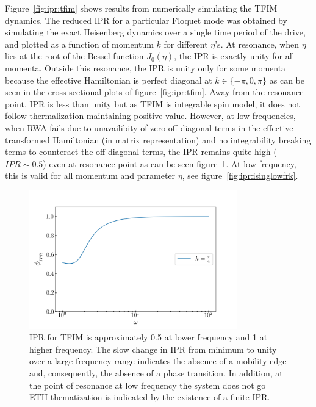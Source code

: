 \documentclass[%
reprint,
superscriptaddress,
amsmath,amssymb,
aps,
prb,
showkeys,
]{revtex4-2}
\begin{document}
	Figure~\ref{fig:ipr:tfim} shows results from numerically simulating the TFIM dynamics. The reduced IPR for a particular Floquet mode was obtained by simulating the exact Heisenberg dynamics over a single time period of the drive, and plotted as a function of momentum $k$ for different $\eta$'s. At resonance, when $\eta$ lies at the root of the Bessel function $J_0(\eta)$,  the IPR is exactly unity for all momenta. Outside this resonance, the IPR is unity only for some momenta because the effective Hamiltonian is perfect diagonal at $k \in{\{-\pi, 0, \pi\}}$ as can be seen in the cross-sectional plots of figure~\ref{fig:ipr:tfim}. Away from the resonance point, IPR is less than unity but as TFIM is integrable spin model, it does not follow thermalization maintaining positive value. However, at low frequencies, when RWA fails due to unavailibity of zero off-diagonal terms in the  effective transformed Hamiltonian (in matrix representation) and no integrability breaking terms to counteract the off diagonal terms, the IPR remains quite high ($IPR \sim 0.5$) even at resonance point as can be seen figure~\ref{fig:ipr:isinglowfr}. At low frequency, this is valid for all momentum and parameter $\eta$, see figure~\ref{fig:ipr:isinglowfrk}.
	
	
	
	\begin{figure}[hbt!]
		\centering
		\includegraphics[height = 6cm, width = 9.0cm]{phase_transition_ising.jpeg}
		\caption{IPR for TFIM is approximately 0.5 at lower frequency and 1 at higher frequency. The slow change in IPR from minimum to unity over a large frequency range indicates the absence of a mobility edge and, consequently, the absence of a phase transition. In addition, at the point of resonance at low frequency the system does not go ETH-thematization is indicated by the existence of a finite IPR.}
		\label{fig:ipr:isinglowfr}
	\end{figure}
	
\end{document}
